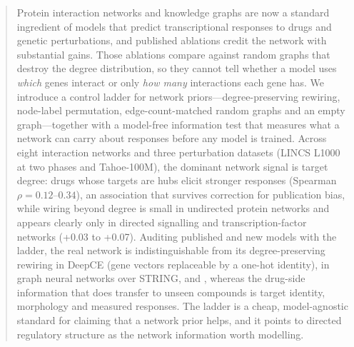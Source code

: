 \begin{abstract}
Protein interaction networks and knowledge graphs are now a standard ingredient of models that predict
transcriptional responses to drugs and genetic perturbations, and published ablations credit the network
with substantial gains.
Those ablations compare against random graphs that destroy the degree distribution, so they cannot tell
whether a model uses \emph{which} genes interact or only \emph{how many} interactions each gene has.
We introduce a control ladder for network priors---degree-preserving rewiring, node-label permutation,
edge-count-matched random graphs and an empty graph---together with a model-free information test that
measures what a network can carry about responses before any model is trained.
Across eight interaction networks and three perturbation datasets (LINCS L1000 at two phases and Tahoe-100M),
the dominant network signal is target degree: drugs whose targets are hubs elicit stronger responses
(Spearman $\rho = 0.12$--$0.34$), an association that survives correction for publication bias, while
wiring beyond degree is small in undirected protein networks and appears clearly only in directed
signalling and transcription-factor networks (+0.03 to +0.07).
Auditing published and new models with the ladder, the real network is indistinguishable from its
degree-preserving rewiring in DeepCE (gene vectors replaceable by a one-hot identity), in graph neural
networks over STRING, and , whereas the drug-side information that
does transfer to unseen compounds is target identity, morphology and measured responses.
The ladder is a cheap, model-agnostic standard for claiming that a network prior helps, and it points to
directed regulatory structure as the network information worth modelling.
\end{abstract}

